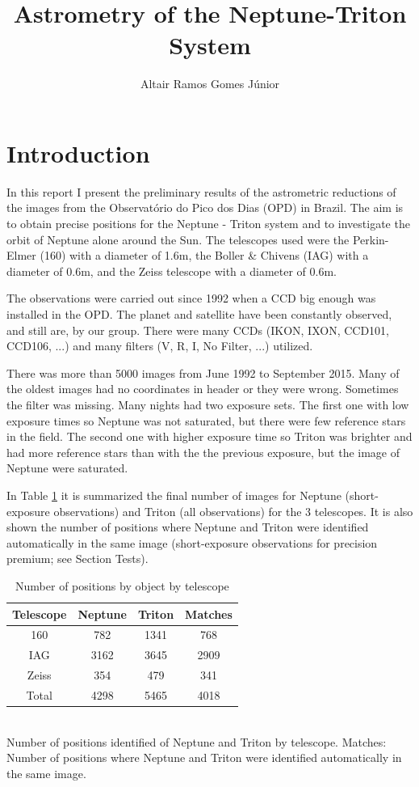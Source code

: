 \documentclass[12pt,a4paper]{report}
\author{Altair Ramos Gomes Júnior}
\title{Astrometry of the Neptune-Triton System}
\newcommand{\PE}{Perkin-Elmer }
\newcommand{\BC}{Boller \& Chivens }
\begin{document}
\maketitle

\pagestyle{headings}

\section*{Introduction}

In this report I present the preliminary results of the astrometric reductions of the images from the Observatório do Pico dos Dias (OPD) in Brazil. The aim is to obtain precise positions for the Neptune - Triton system and to investigate the orbit of Neptune alone around the Sun. The telescopes used were the \PE (160) with a diameter of 1.6m, the \BC (IAG) with a diameter of 0.6m, and the Zeiss telescope with a diameter of 0.6m.

The observations were carried out since 1992 when a CCD big enough was installed in the OPD. The planet and satellite have been constantly observed, and still are, by our group. There were many CCDs (IKON, IXON, CCD101, CCD106, ...) and many filters (V, R, I, No Filter, ...) utilized.

There was more than 5000 images from June 1992 to September 2015. Many of the oldest images had no coordinates in header or they were wrong. Sometimes the filter was missing. Many nights had two exposure sets. The first one with low exposure times so Neptune was not saturated, but there were few reference stars in the field. The second one with higher exposure time so Triton was brighter and had more reference stars than with the the previous exposure, but the image of Neptune were saturated.

In Table \ref{Tab:dados} it is summarized the final number of images for Neptune (short-exposure observations) and Triton (all observations) for the 3 telescopes. It is also shown the number of positions where Neptune and Triton were identified automatically in the same image (short-exposure observations for precision premium; see Section Tests).

\begin{table}[h]
\centering
\caption{Number of positions by object by telescope}
\label{Tab:dados}
\begin{tabular}{|c|c|c|c|}
\hline 
Telescope & Neptune & Triton & Matches \\ 
\hline
160 & 782 & 1341 & 768 \\ 
\hline 
IAG & 3162 & 3645 & 2909 \\ 
\hline 
Zeiss & 354 & 479 & 341 \\ 
\hline 
Total & 4298 & 5465 & 4018 \\ 
\hline 
\end{tabular}
\\Number of positions identified of Neptune and Triton by telescope. Matches: Number of positions where Neptune and Triton were identified automatically in the same image.
\end{table}
\end{document}
